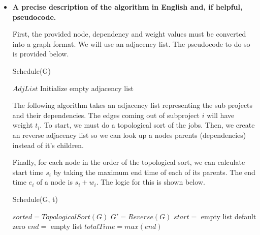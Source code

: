 \documentclass[letterpaper,11pt]{article}
\begin{document}
\newpage
\begin{itemize}

    \color{teal}
    \item \textbf{A precise description of the algorithm in English and, if helpful, pseudocode.}

        First, the provided node, dependency and weight values must be
        converted into a graph format. We will use an adjacency list. The 
        pseudocode to do so is provided below.

        \begin{algorithm}[H]
            \color{teal}
            \caption{Schedule(G)} 
            $AdjList$ Initialize empty adjacency list \;
        \end{algorithm}

        The following algorithm takes an adjacency list representing the
        sub projects and their dependencies. The edges coming out of subproject
        $i$ will have weight $t_i$. To start, we must do a topological sort of
        the jobs. Then, we create an reverse adjacency list so we can look up 
        a nodes parents (dependencies) instead of it's children. 

        Finally, for each node in the order of the topological sort, we can 
        calculate start time $s_i$ by taking the maximum end time of each of 
        its parents. The end time $e_i$ of a node is $s_i + w_i$. The logic for 
        this is shown below.

        \begin{algorithm}[H]
            \color{teal}
            \caption{Schedule(G, t)} 
            $sorted = TopologicalSort(G)$ \;
            $G' = Reverse(G)$ \;
            $start = $ empty list default zero \;
            $end = $ empty list \;
            $totalTime = max(end)$\;
        \end{algorithm}



\end{itemize}
\end{document}
